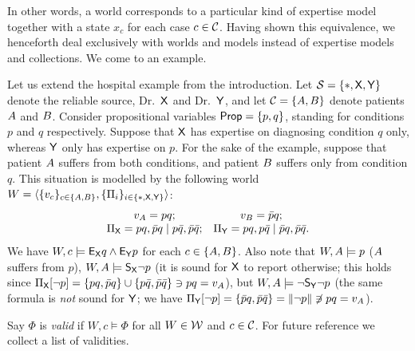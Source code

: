 In other words, a world corresponds to a particular kind of expertise model
together with a state $x_c$ for each case $c \in \mathcal{C}$. Having shown this
equivalence, we henceforth deal exclusively with worlds and models instead of
expertise models and collections. We come to an example.

\begin{example}
    \label{kr_ex_hospital_world}
    Let us extend the hospital example from the introduction. Let $\mathcal{S} = \{\ast,
    \mathsf{X}, \mathsf{Y}\}$ denote the reliable source, Dr.\ $\mathsf{X}$ and Dr.\ $\mathsf{Y}$, and let $\mathcal{C} = \{A,
    B\}$ denote patients $A$ and $B$. Consider propositional variables
    $\mathsf{Prop} = \{p, q\}$, standing
    for conditions $p$ and $q$ respectively. Suppose that $\mathsf{X}$ has expertise on
    diagnosing condition $q$ only, whereas $\mathsf{Y}$ only has expertise on $p$. For the
    sake of the example, suppose that patient $A$ suffers from both conditions,
    and patient $B$ suffers only from condition $q$. This situation is modelled by
    the following world $W = \langle {\{v_c\}_{c \in \{A, B\}}, \{\Pi_i\}_{i
    \in \{\ast, \mathsf{X}, \mathsf{Y}\}}} \rangle$:
    \[
        \begin{array}{cc}
            v_{A} = pq;
            &
            v_{B} = \bar{p}q;
            \\
            \Pi_{\mathsf{X}} = pq, \bar{p}q \mid p\bar{q}, \bar{p}\bar{q};
            &
            \Pi_{\mathsf{Y}} = pq, p\bar{q} \mid \bar{p}q, \bar{p}\bar{q}.
        \end{array}
    \]
    We have $W, c \models \mathsf{E}_{\mathsf{X}} q
    \land \mathsf{E}_{\mathsf{Y}} p$ for each $c \in \{A, B\}$. Also note that $W, A \models
    p$ ($A$ suffers from $p$), $W, A \models \mathsf{S}_{\mathsf{X}}{\neg p}$ (it is sound
    for $\mathsf{X}$ to report otherwise; this holds since $\Pi_{\mathsf{X}}[\neg p] = \{pq,
    \bar{p}q\} \cup \{p\bar{q}, \bar{p}\bar{q}\} \ni pq = v_{A}$), but $W,
    A \models \neg \mathsf{S}_{\mathsf{Y}}{\neg p}$ (the same formula is \emph{not} sound for
    $\mathsf{Y}$;
    we have $\Pi_{\mathsf{Y}}[\neg p] = \{\bar{p}q, \bar{p}\bar{q}\} = \|{\neg
    p}\| \not\ni pq = v_{A}$).
\end{example}

Say $\Phi$ is \emph{valid} if $W, c \models \Phi$ for all $W \in \mathcal{W}$ and $c \in \mathcal{C}$.
For future reference we collect a list of validities.\footnotemark{}


